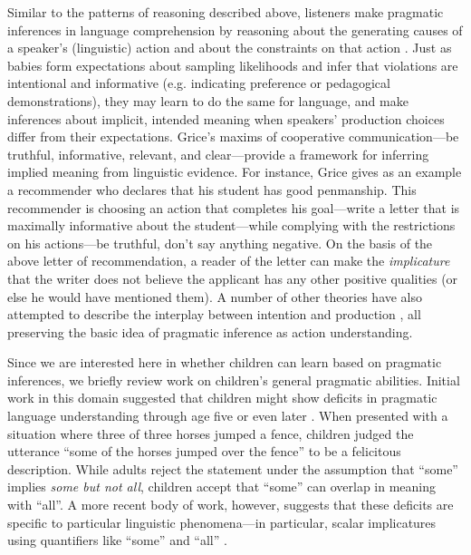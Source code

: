 \documentclass[man]{apa2}
\begin{document}

Similar to the patterns of reasoning described above, listeners make pragmatic inferences in language comprehension by reasoning about the generating causes of a speaker's (linguistic) action and about the constraints on that action \cite{shafto2012}. Just as babies form expectations about sampling likelihoods and infer that violations are intentional and informative (e.g. indicating preference or pedagogical demonstrations), they may learn to do the same for language, and make inferences about implicit, intended meaning when speakers' production choices differ from their expectations. Grice's \citeyear{grice1975} maxims of cooperative communication---be truthful, informative, relevant, and clear---provide a framework for inferring implied meaning from linguistic evidence. For instance, Grice gives as an example a recommender who declares that his student has good penmanship. This recommender is choosing an action that completes his goal---write a letter that is maximally informative about the student---while complying with the restrictions on his actions---be truthful, don't say anything negative. On the basis of the above letter of recommendation, a reader of the letter can make the \emph{implicature} that the writer does not believe the applicant has any other positive qualities (or else he would have mentioned them). A number of other theories have also attempted to describe the interplay between intention and production \cite{horn1984,sperber1986,clark1996,levinson2000}, all preserving the basic idea of pragmatic inference as action understanding. 

Since we are interested here in whether children can learn based on pragmatic inferences, we briefly review work on children's general pragmatic abilities. Initial work in this domain suggested that children might show deficits in pragmatic language understanding through age five or even later \cite{noveck2000,papafragou2003}. When presented with a situation where three of three horses jumped a fence, children judged the utterance ``some of the horses jumped over the fence'' to be a felicitous description. While adults reject the statement under the assumption that ``some'' implies \emph{some but not all}, children accept that ``some'' can overlap in meaning with ``all''.  A more recent body of work, however, suggests that these deficits are specific to particular linguistic phenomena---in particular, scalar implicatures using quantifiers like ``some'' and ``all'' \cite{barner2011,katsos2011}.
\end{document}
